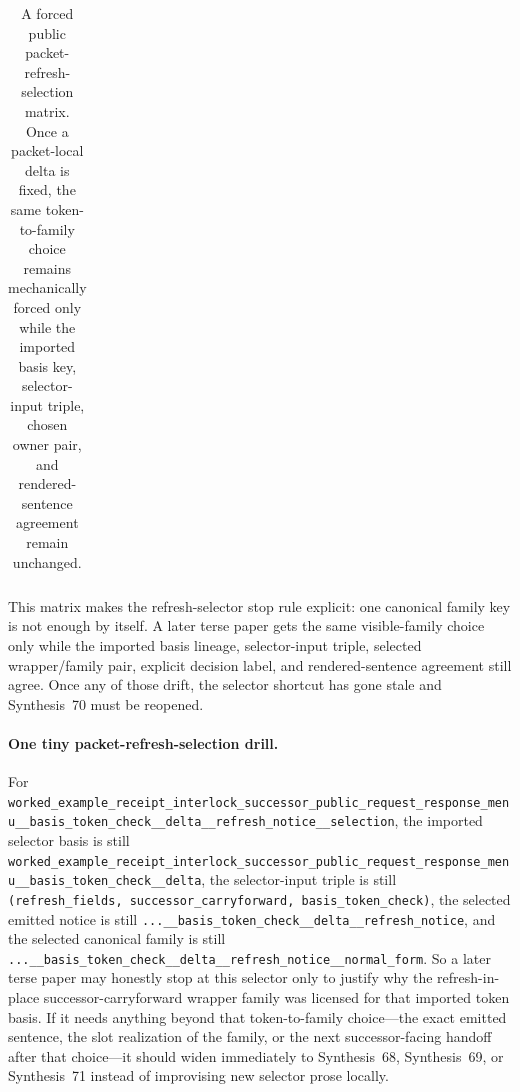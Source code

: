 \documentclass[11pt]{article}
\begin{document}
\begin{table}[t]
\begin{tabularx}{0.97\linewidth}{@{}p{0.31\linewidth}X X@{}}
\bottomrule
\end{tabularx}
\caption{A forced public packet-refresh-selection matrix. Once a packet-local delta is fixed, the same token-to-family choice remains mechanically forced only while the imported basis key, selector-input triple, chosen owner pair, and rendered-sentence agreement remain unchanged.}
\label{tab:forced-public-packet-refresh-selection-matrix}
\end{table}

This matrix makes the refresh-selector stop rule explicit: one canonical family key is not enough by itself. A later terse paper gets the same visible-family choice only while the imported basis lineage, selector-input triple, selected wrapper/family pair, explicit decision label, and rendered-sentence agreement still agree. Once any of those drift, the selector shortcut has gone stale and Synthesis~70 must be reopened.\cite{series:workedexample}

\paragraph{One tiny packet-refresh-selection drill.}
For \nolinkurl{worked_example_receipt_interlock_successor_public_request_response_menu__basis_token_check__delta__refresh_notice__selection}, the imported selector basis is still \nolinkurl{worked_example_receipt_interlock_successor_public_request_response_menu__basis_token_check__delta}, the selector-input triple is still \nolinkurl{(refresh_fields, successor_carryforward, basis_token_check)}, the selected emitted notice is still \nolinkurl{...__basis_token_check__delta__refresh_notice}, and the selected canonical family is still \nolinkurl{...__basis_token_check__delta__refresh_notice__normal_form}. So a later terse paper may honestly stop at this selector only to justify why the refresh-in-place successor-carryforward wrapper family was licensed for that imported token basis. If it needs anything beyond that token-to-family choice---the exact emitted sentence, the slot realization of the family, or the next successor-facing handoff after that choice---it should widen immediately to Synthesis~68, Synthesis~69, or Synthesis~71 instead of improvising new selector prose locally.\cite{series:workedexample}
\end{document}
